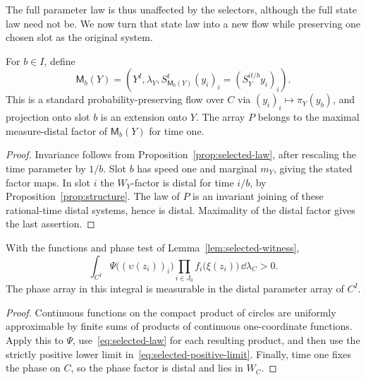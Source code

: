 The full parameter law is thus unaffected by the selectors, although
the full state law need not be.  We now turn that state law into a new
flow while preserving one chosen slot as the original system.

\begin{lemma}\label{lem:normalized-joining}
For $b\in I$, define
\begin{equation}\label{eq:normalized-joining}
 \mathsf M_b(Y)=
 \left(Y^I,\lambda_Y,
   S_{\mathsf M_b(Y)}^t(y_i)_i=(S_Y^{it/b}y_i)_i\right).
\end{equation}
This is a standard probability-preserving flow over $C$ via
$(y_i)_i\mapsto\pi_Y(y_b)$, and projection onto slot $b$ is an
extension onto $Y$.  The array $P$ belongs to the maximal
measure-distal factor of $\mathsf M_b(Y)$ for time one.
\end{lemma}

\begin{proof}
Invariance follows from Proposition~\ref{prop:selected-law}, after
rescaling the time parameter by $1/b$.  Slot $b$ has speed one and
marginal $m_Y$, giving the stated factor maps.  In slot $i$ the
$W_Y$-factor is distal for time $i/b$, by
Proposition~\ref{prop:structure}.  The law of $P$ is an invariant
joining of these rational-time distal systems, hence is distal.
Maximality of the distal factor gives the last assertion.
\end{proof}

\begin{lemma}\label{lem:positive-witness}
With the functions and phase test of Lemma~\ref{lem:selected-witness},
\begin{equation}\label{eq:positive-witness}
 \int_{C^I}\Psi\bigl((\upsilon(z_i))_i\bigr)
    \prod_{i\in J_0}f_i\bigl(\xi(z_i)\bigr)\,\dd\lambda_C>0.
\end{equation}
The phase array in this integral is measurable in the distal
parameter array of $C^I$.
\end{lemma}

\begin{proof}
Continuous functions on the compact product of circles are uniformly
approximable by finite sums of products of continuous one-coordinate
functions.  Apply this to $\Psi$, use~\eqref{eq:selected-law} for
each resulting product, and then use the strictly positive lower
limit in~\eqref{eq:selected-positive-limit}.  Finally, time one fixes
the phase on $C$, so the phase factor is distal and lies in $W_C$.
\end{proof}
